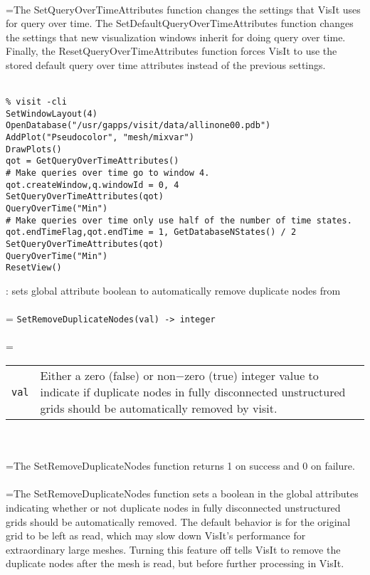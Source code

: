 \documentclass[10pt,a4paper]{report}
\begin{document}
 \\ 
\hangindent=\parindent The SetQueryOverTimeAttributes function changes the settings that VisIt uses for query over time. The SetDefaultQueryOverTimeAttributes function changes the settings that new visualization windows inherit for doing query over time. Finally, the ResetQueryOverTimeAttributes function forces VisIt to use the stored default query over time attributes instead of the previous settings. \\[-3mm] 

\\[-6mm]
\begin{verbatim}% visit -cli
SetWindowLayout(4)
OpenDatabase("/usr/gapps/visit/data/allinone00.pdb")
AddPlot("Pseudocolor", "mesh/mixvar")
DrawPlots()
qot = GetQueryOverTimeAttributes()
# Make queries over time go to window 4.
qot.createWindow,q.windowId = 0, 4
SetQueryOverTimeAttributes(qot)
QueryOverTime("Min")
# Make queries over time only use half of the number of time states.
qot.endTimeFlag,qot.endTime = 1, GetDatabaseNStates() / 2
SetQueryOverTimeAttributes(qot)
QueryOverTime("Min")
ResetView()
\end{verbatim}
\newpage


{}
: sets global attribute boolean to automatically remove duplicate nodes from\\[-3mm]

 \\ 
\hangindent=\parindent 
\verb!SetRemoveDuplicateNodes(val) -> integer!\\ [-3mm]

 \\ 
\hangindent=\parindent 
\begin{tabular}{lp{9cm}}
\verb!val! & Either a zero (false) or non$-$zero (true) integer value to indicate if duplicate nodes in fully disconnected unstructured grids should be  automatically removed by visit. \\
\end{tabular} \\[-2mm]


 \\ 
\hangindent=\parindent The SetRemoveDuplicateNodes function returns 1 on success and 0 on failure. \\[-3mm] 

 \\ 
\hangindent=\parindent The SetRemoveDuplicateNodes function sets a boolean in the  global attributes indicating whether or not duplicate nodes in fully disconnected unstructured grids should be automatically removed. The default behavior is for the original grid to be left as read, which  may slow down VisIt's performance for extraordinary large meshes.  Turning this feature off tells VisIt to remove the duplicate nodes after  the mesh is read, but before further processing in VisIt. \\[-3mm] 
\end{document}
